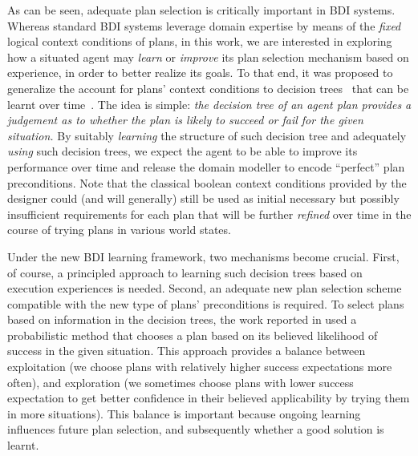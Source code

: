 As can be seen, adequate plan selection is critically important in BDI systems. Whereas standard BDI systems leverage domain expertise by means of the \emph{fixed} logical context conditions of plans, in this work, we are interested in exploring how a situated agent may \emph{learn} or \emph{improve} its plan selection mechanism based on experience, in order to better realize its goals.
To that end, it was proposed to generalize the account for plans' context conditions to decision trees~\cite{Mitchell97:ML} that can be learnt over time~\cite{airiau09:enhancing,singh10:extending,singh10:learning}. The idea is simple: \emph{the decision tree of an agent plan provides a judgement as to whether the plan is likely to succeed or fail for the given situation.}
By suitably \emph{learning} the structure of such decision tree and adequately \emph{using} such decision trees, we expect the agent to be able to improve its performance over time and release the domain modeller to encode ``perfect'' plan preconditions. Note that the classical boolean context conditions provided by the designer could (and will generally) still be used as initial necessary but possibly insufficient requirements for each plan that will be further \emph{refined} over time in the course of trying plans in various world states.


Under the new BDI learning framework, two mechanisms become crucial. First, of course, a principled approach to learning such decision trees based on execution experiences is needed. Second, an adequate new plan selection scheme compatible with the new type of plans' preconditions is required.
To select plans based on information in the decision trees, the work reported in \cite{singh10:extending,singh10:learning} used a probabilistic method that chooses a plan based on its believed likelihood of success in the given situation. This approach provides a balance between exploitation (we choose plans with relatively higher success expectations more often), and exploration (we sometimes choose plans with lower success expectation to get better confidence in their believed applicability by trying them in more situations). This balance is important because ongoing learning influences future plan selection, and subsequently whether a good solution is learnt.

